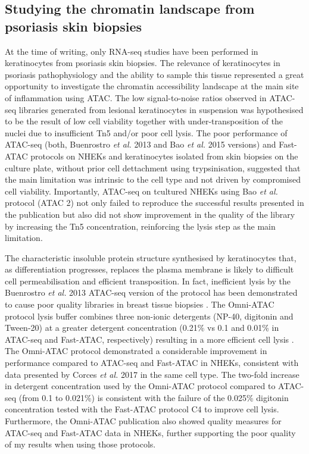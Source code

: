 \subsection{Studying the chromatin landscape from psoriasis skin biopsies}
At the time of writing, only RNA-seq studies have been performed in keratinocytes from psoriasis skin biopsies. The relevance of keratinocytes in psoriasis pathophysiology and the ability to sample this tissue represented a great opportunity to investigate the chromatin accessibility landscape at the main site of inflammation using ATAC. The low signal-to-noise ratios observed in ATAC-seq libraries generated from lesional keratinocytes in suspension was hypothesised to be the result of low cell viability together with under-transposition of the nuclei due to insufficient Tn5 and/or poor cell lysis. The poor performance of ATAC-seq (both, Buenrostro \textit{et al.} 2013 and Bao \textit{et al.} 2015 versions) and Fast-ATAC protocols on NHEKs and keratinocytes isolated from skin biopsies on the culture plate, without prior cell dettachment using trypsinisation, suggested that the main limitation was intrinsic to the cell type and not driven by compromised cell viability. Importantly, ATAC-seq on tcultured NHEKs using Bao \textit{et al.} protocol (ATAC 2) not only failed to reproduce the successful results presented in the publication but also did not show improvement in the quality of the library by increasing the Tn5 concentration, reinforcing the lysis step as the main limitation.

The characteristic insoluble protein structure synthesised by keratinocytes that, as differentiation progresses, replaces the plasma membrane is likely to difficult cell permeabilisation and efficient transposition. In fact, inefficient lysis by the Buenrostro \textit{et al.} 2013 ATAC-seq version of the protocol has been demonstrated to cause poor quality libraries in breast tissue biopsies \parencite{Fijiwara2019}. The Omni-ATAC protocol lysis buffer combines three non-ionic detergents (NP-40, digitonin and Tween-20) at a greater detergent concentration (0.21\% vs 0.1 and 0.01\% in ATAC-seq and Fast-ATAC, respectively) resulting in a more efficient cell lysis \parencite{Corces2017}.  The Omni-ATAC protocol demonstrated a considerable improvement in performance compared to ATAC-seq and Fast-ATAC in NHEKs, consistent with data presented by Corces \textit{et al.} 2017 in the same cell type. The two-fold increase in detergent concentration used by the Omni-ATAC protocol compared to ATAC-seq (from 0.1 to 0.021\%) is consistent with the failure of the 0.025\% digitonin concentration tested with the Fast-ATAC protocol C4 to improve cell lysis. Furthermore, the Omni-ATAC publication also showed quality measures for ATAC-seq and Fast-ATAC data in NHEKs, further supporting the poor quality of my results when using those protocols. 

